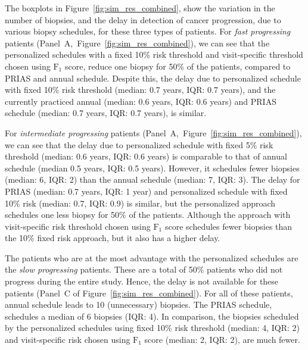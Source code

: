 The boxplots in Figure~\ref{fig:sim_res_combined}, show the variation in the number of biopsies, and the delay in detection of cancer progression, due to various biopsy schedules, for these three types of patients. For \textit{fast progressing} patients (Panel~A,~Figure~\ref{fig:sim_res_combined}), we can see that the personalized schedules with a fixed 10\% risk threshold and visit-specific threshold chosen using $\mbox{F}_1$ score, reduce one biopsy for 50\% of the patients, compared to PRIAS and annual schedule. Despite this, the delay due to personalized schedule with fixed 10\% risk threshold (median: 0.7 years, IQR: 0.7 years), and the currently practiced annual (median: 0.6 years, IQR: 0.6 years) and PRIAS schedule (median: 0.7 years, IQR: 0.7 years), is similar.

For \textit{intermediate progressing} patients (Panel~A,~Figure~\ref{fig:sim_res_combined}), we can see that the delay due to personalized schedule with fixed 5\% risk threshold (median: 0.6 years, IQR: 0.6 years) is comparable to that of annual schedule (median 0.5 years, IQR: 0.5 years). However, it schedules fewer biopsies (median: 6, IQR: 2) than the annual schedule (median: 7, IQR: 3). The delay for PRIAS (median: 0.7 years, IQR: 1 year) and personalized schedule with fixed 10\% risk (median: 0.7, IQR: 0.9) is similar, but the personalized approach schedules one less biopsy for 50\% of the patients. Although the approach with visit-specific risk threshold chosen using $\mbox{F}_1$ score schedules fewer biopsies than the 10\% fixed risk approach, but it also has a higher delay.

The patients who are at the most advantage with the personalized schedules are the \textit{slow progressing} patients. These are a total of 50\% patients who did not progress during the entire study. Hence, the delay is not available for these patients (Panel~C of Figure~\ref{fig:sim_res_combined}). For all of these patients, annual schedule leads to 10 (unnecessary) biopsies. The PRIAS schedule, schedules a median of 6 biopsies (IQR: 4). In comparison, the biopsies scheduled by the personalized schedules using fixed 10\% risk threshold (median: 4, IQR: 2) and visit-specific risk chosen using $\mbox{F}_1$ score (median: 2, IQR: 2), are much fewer.
